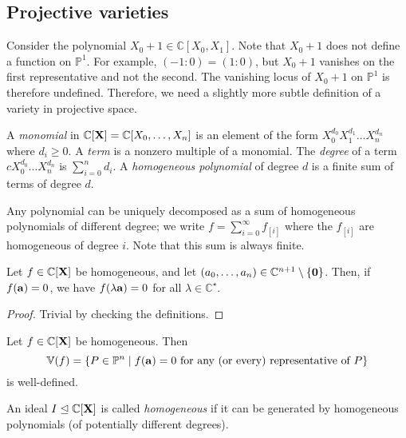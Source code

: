 \subsection{Projective varieties}
\begin{example}
    Consider the polynomial \( X_0 + 1 \in \mathbb C[X_0, X_1] \).
    Note that \( X_0 + 1 \) does not define a function on \( \mathbb P^1 \).
    For example, \( (-1 : 0) = (1 : 0) \), but \( X_0 + 1 \) vanishes on the first representative and not the second.
    The vanishing locus of \( X_0 + 1 \) on \( \mathbb P^1 \) is therefore undefined.
    Therefore, we need a slightly more subtle definition of a variety in projective space.
\end{example}
\begin{definition}
    A \emph{monomial} in \( \mathbb C[\vb X] = \mathbb C[X_0, \dots, X_n] \) is an element of the form \( X_0^{d_0} X_1^{d_1} \dots X_n^{d_n} \) where \( d_i \geq 0 \).
    A \emph{term} is a nonzero multiple of a monomial.
    The \emph{degree} of a term \( cX_0^{d_0} \dots X_n^{d_n} \) is \( \sum_{i=0}^n d_i \).
    A \emph{homogeneous polynomial} of degree \( d \) is a finite sum of terms of degree \( d \).
\end{definition}
Any polynomial can be uniquely decomposed as a sum of homogeneous polynomials of different degree; we write \( f = \sum_{i=0}^\infty f_{[i]} \) where the \( f_{[i]} \) are homogeneous of degree \( i \).
Note that this sum is always finite.
\begin{lemma}
    Let \( f \in \mathbb C[\vb X] \) be homogeneous, and let \( (a_0, \dots, a_n) \in \mathbb C^{n+1} \setminus \qty{\vb 0} \).
    Then, if \( f(\vb a) = 0 \), we have \( f(\lambda \vb a) = 0 \) for all \( \lambda \in \mathbb C^\star \).
\end{lemma}
\begin{proof}
    Trivial by checking the definitions.
\end{proof}
\begin{corollary}
    Let \( f \in \mathbb C[\vb X] \) be homogeneous.
    Then
    \[ \mathbb V(f) = \qty{P \in \mathbb P^n \mid f(\vb a) = 0 \text{ for any (or every) representative of } P} \]
    is well-defined.
\end{corollary}
\begin{definition}
    An ideal \( I \trianglelefteq \mathbb C[\vb X] \) is called \emph{homogeneous} if it can be generated by homogeneous polynomials (of potentially different degrees).
\end{definition}

